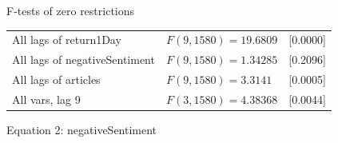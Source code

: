 \begin{center}
F-tests of zero restrictions\\[1em]
\begin{tabular}{lll}
All lags of return1Day & $F(9, 1580) = 19.6809$ & [0.0000]\\
All lags of negativeSentiment & $F(9, 1580) = 1.34285$ & [0.2096]\\
All lags of articles & $F(9, 1580) = 3.3141$ & [0.0005]\\
All vars, lag 9 & $F(3, 1580) = 4.38368$ & [0.0044]\\
\end{tabular}
\end{center}

\begin{center}

Equation 2: negativeSentiment\\


\end{center}
